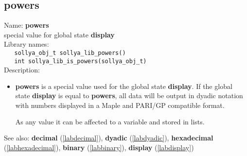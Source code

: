 \subsection{powers}
\label{labpowers}
\noindent Name: \textbf{powers}\\
\phantom{aaa}special value for global state \textbf{display}\\[0.2cm]
\noindent Library names:\\
\verb|   sollya_obj_t sollya_lib_powers()|\\
\verb|   int sollya_lib_is_powers(sollya_obj_t)|\\[0.2cm]
\noindent Description: \begin{itemize}

\item \textbf{powers} is a special value used for the global state \textbf{display}.  If
   the global state \textbf{display} is equal to \textbf{powers}, all data will be
   output in dyadic notation with numbers displayed in a Maple and
   PARI/GP compatible format.
    
   As any value it can be affected to a variable and stored in lists.
\end{itemize}
See also: \textbf{decimal} (\ref{labdecimal}), \textbf{dyadic} (\ref{labdyadic}), \textbf{hexadecimal} (\ref{labhexadecimal}), \textbf{binary} (\ref{labbinary}), \textbf{display} (\ref{labdisplay})
